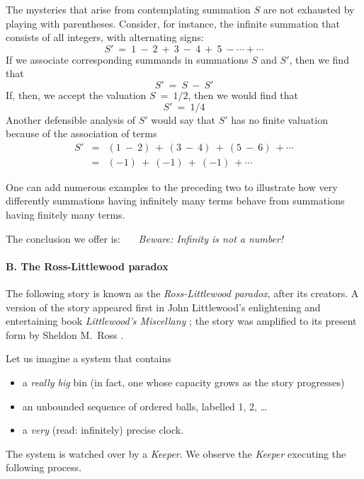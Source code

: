 \medskip

The mysteries that arise from contemplating summation $S$ are not exhausted by playing with parentheses.  Consider, for instance, the infinite summation that consists of all integers, with alternating signs:
\[ S' \ = \ 1 \ - \ 2 \ + \ 3 \ - \ 4 \ + \ 5 \ - \cdots + \cdots \]
If we associate corresponding summands in summations $S$ and $S'$, then we find that
\[ S'  \ = \  S  \ - \ S'  \]
If, then, we accept the valuation $S \ = \ 1/2$, then we would find that
\[ S' \ = \ 1/4 \]
Another defensible analysis of $S'$ would say that $S'$ has no finite valuation because of the association of terms
\begin{eqnarray*}
S' & = & (1 \ - \ 2) \ + \ (3 \ - \ 4) \ + \ (5 \ - \ 6) \ + \cdots \\
    & = & (-1) \ + \ (-1) \ + \ (-1) \ +  \cdots
\end{eqnarray*}

\smallskip

One can add numerous examples to the preceding two to illustrate how very differently summations having infinitely many terms behave from summations having finitely many terms.

The conclusion we offer is: \ \ \ {\em Beware:  Infinity is not a number!}

\paragraph{B. The Ross-Littlewood paradox}

  
The following story is known as the {\it Ross-Littlewood paradox}, after its creators.  A version of the story appeared first in John Littlewood's enlightening and entertaining book {\it Littlewood's Miscellany} \cite{Littlewood-misc}; the story was amplified to its present form by Sheldon M.~Ross \cite{Ross76}. 

\medskip

Let us imagine a system that contains
\begin{itemize}
\item
a {\em really big} bin (in fact, one whose capacity grows as the story progresses)

\medskip\item
an unbounded sequence of ordered balls, labelled 1, 2, \ldots

\medskip\item
a {\em very} (read: infinitely) precise clock.
\end{itemize}
The system is watched over by a {\it Keeper}.  We observe the {\it Keeper} executing the following process.


